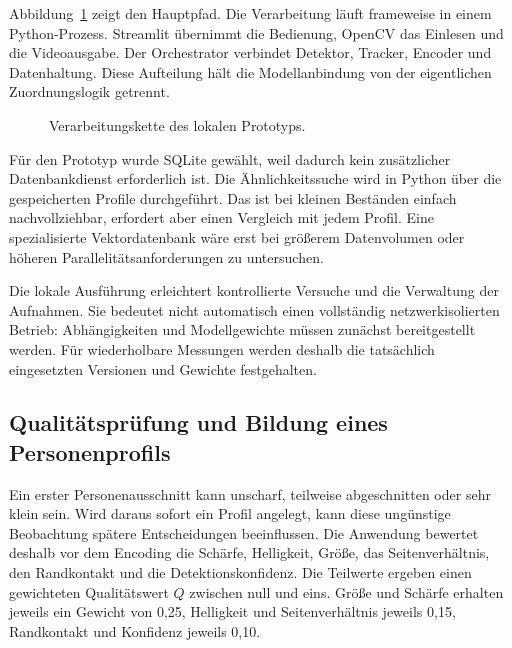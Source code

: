 \documentclass[runningheads]{llncs}
\begin{document}
Abbildung~\ref{fig:architecture} zeigt den Hauptpfad. Die Verarbeitung läuft frameweise in einem Python-Prozess. Streamlit übernimmt die Bedienung, OpenCV das Einlesen und die Videoausgabe. Der Orchestrator verbindet Detektor, Tracker, Encoder und Datenhaltung. Diese Aufteilung hält die Modellanbindung von der eigentlichen Zuordnungslogik getrennt.

\begin{figure}[tbp]
\centering
{}
\caption{Verarbeitungskette des lokalen Prototyps.}
\label{fig:architecture}
\end{figure}

Für den Prototyp wurde SQLite gewählt, weil dadurch kein zusätzlicher Datenbankdienst erforderlich ist. Die Ähnlichkeitssuche wird in Python über die gespeicherten Profile durchgeführt. Das ist bei kleinen Beständen einfach nachvollziehbar, erfordert aber einen Vergleich mit jedem Profil. Eine spezialisierte Vektordatenbank wäre erst bei grö{\ss}erem Datenvolumen oder höheren Parallelitätsanforderungen zu untersuchen.

Die lokale Ausführung erleichtert kontrollierte Versuche und die Verwaltung der Aufnahmen. Sie bedeutet nicht automatisch einen vollständig netzwerkisolierten Betrieb: Abhängigkeiten und Modellgewichte müssen zunächst bereitgestellt werden. Für wiederholbare Messungen werden deshalb die tatsächlich eingesetzten Versionen und Gewichte festgehalten.

\subsection{Qualitätsprüfung und Bildung eines Personenprofils}

Ein erster Personenausschnitt kann unscharf, teilweise abgeschnitten oder sehr klein sein. Wird daraus sofort ein Profil angelegt, kann diese ungünstige Beobachtung spätere Entscheidungen beeinflussen. Die Anwendung bewertet deshalb vor dem Encoding die Schärfe, Helligkeit, Grö{\ss}e, das Seitenverhältnis, den Randkontakt und die Detektionskonfidenz. Die Teilwerte ergeben einen gewichteten Qualitätswert $Q$ zwischen null und eins. Grö{\ss}e und Schärfe erhalten jeweils ein Gewicht von 0,25, Helligkeit und Seitenverhältnis jeweils 0,15, Randkontakt und Konfidenz jeweils 0,10.
\end{document}
